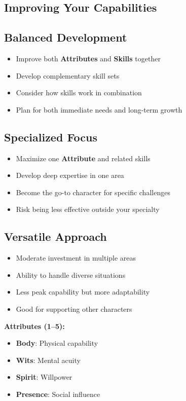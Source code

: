 \begin{multicols}{2}
\section{Improving Your Capabilities}

\subsection*{Balanced Development}
\begin{itemize}
\item Improve both \textbf{Attributes} and \textbf{Skills} together
\item Develop complementary skill sets
\item Consider how skills work in combination
\item Plan for both immediate needs and long-term growth
\end{itemize}

\subsection*{Specialized Focus}
\begin{itemize}
\item Maximize one \textbf{Attribute} and related skills
\item Develop deep expertise in one area
\item Become the go-to character for specific challenges
\item Risk being less effective outside your specialty
\end{itemize}

\subsection*{Versatile Approach}
\begin{itemize}
\item Moderate investment in multiple areas
\item Ability to handle diverse situations
\item Less peak capability but more adaptability
\item Good for supporting other characters
\end{itemize}

\begin{tcolorbox}[colback=blue!5!white,colframe=blue!75!black,title=Attributes and Skills Quick Reference,fonttitle=\bfseries]
\textbf{Attributes (1--5):}
\begin{itemize}
\item \textbf{Body}: Physical capability
\item \textbf{Wits}: Mental acuity
\item \textbf{Spirit}: Willpower
\item \textbf{Presence}: Social influence
\end{itemize}


\end{tcolorbox}
\end{multicols}
